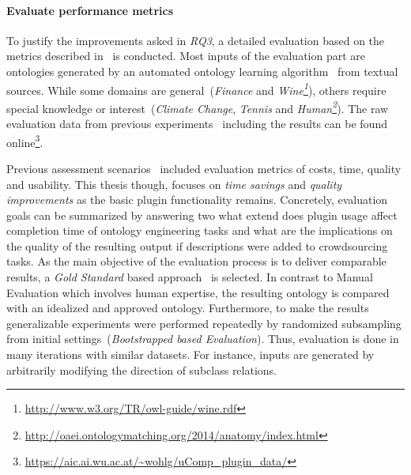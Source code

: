 \documentclass[12pt, notitlepage]{article}
\begin{document}
\paragraph{Evaluate performance metrics}
To justify the improvements asked in \emph{RQ3}, a detailed evaluation based on the metrics described in~\cite{wohlgenannt2016crowd} is conducted. Most inputs of the evaluation part are ontologies generated by an automated ontology learning algorithm~\cite{wohlgenannt2012dynamic} from textual sources. While some domains are general~(\emph{Finance} and \emph{Wine\footnote{\url{http://www.w3.org/TR/owl-guide/wine.rdf}}}), others require special knowledge or interest~(\emph{Climate Change}, \emph{Tennis} and \emph{Human\footnote{\url{http://oaei.ontologymatching.org/2014/anatomy/index.html}}}). The raw evaluation data from previous experiments~\cite{wohlgenannt2016crowd} including the results can be found online\footnote{\url{https://aic.ai.wu.ac.at/~wohlg/uComp_plugin_data/}}. 

Previous assessment scenarios~\cite{wohlgenannt2016crowd, wohlgenannt2009crowd} included evaluation metrics of costs, time, quality and usability. This thesis though, focuses on \emph{time savings} and \emph{quality improvements} as the basic plugin functionality remains. Concretely, evaluation goals can be summarized by answering two what extend does plugin usage affect completion time of ontology engineering tasks and what are the implications on the quality of the resulting output if descriptions were added to crowdsourcing tasks. 
As the main objective of the evaluation process is to deliver comparable results, a \emph{Gold Standard} based approach~\cite{brank2005survey} is selected. In contrast to Manual Evaluation which involves human expertise, the resulting ontology is compared with an idealized and approved ontology. Furthermore, to make the results generalizable experiments were performed repeatedly by randomized subsampling from initial settings~(\emph{Bootstrapped based Evaluation}). Thus, evaluation is done in many iterations with similar datasets. For instance, inputs are generated by arbitrarily modifying the direction of subclass relations. 
\end{document}
